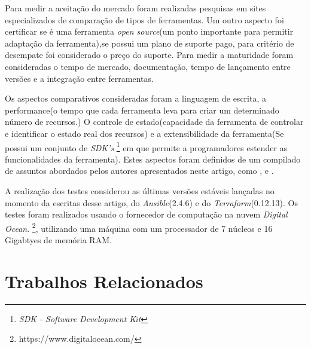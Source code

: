 Para medir a aceitação do mercado foram realizadas pesquisas em sites especializados de comparação de tipos de ferramentas. Um outro aspecto foi certificar se é uma ferramenta \textit{open source}(um ponto importante para permitir adaptação da ferramenta),se possui um plano de suporte pago, para critério de desempate foi considerado o preço do suporte. Para medir a maturidade foram consideradas o tempo de mercado, documentação, tempo de lançamento entre versões e a integração entre ferramentas.

Os aspectos comparativos consideradas foram a linguagem de escrita, a performance(o tempo que cada ferramenta leva para criar um determinado número de recursos.) O controle de estado(capacidade da ferramenta  de controlar e identificar o estado real dos recursos) e a extensibilidade da ferramenta(Se possui um conjunto de \textit{SDK's} \footnote{\textit{SDK - Software Development Kit}} em que permite a programadores estender as funcionalidades da ferramenta).  Estes aspectos foram definidos de um compilado de assuntos abordados pelos autores apresentados neste artigo, como \cite{steve}, \cite{masek} e \cite{Morris:2016:ICM:3006361}.

A realização dos testes considerou as últimas versões estáveis lançadas no momento da escritas desse artigo, do \textit{Ansible}(2.4.6) e do \textit{Terraform}(0.12.13). Os testes foram realizados usando o fornecedor de computação na nuvem  \textit{Digital Ocean}. \footnote{https://www.digitalocean.com/}, utilizando uma máquina com um processador de 7 núcleos e 16 Gigabtyes de memória RAM.   


\section{\esp Trabalhos Relacionados} \label{relacionados}


